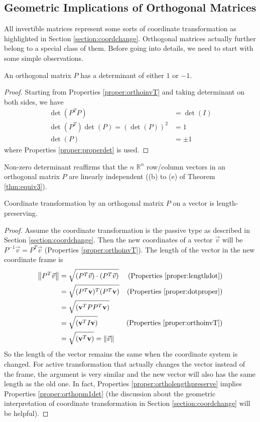 \subsection{Geometric Implications of Orthogonal Matrices}
\label{section:orthogeometricsub}
All invertible matrices represent some sorts of coordinate transformation as highlighted in Section \ref{section:coordchange}. Orthogonal matrices actually further belong to a special class of them. Before going into details, we need to start with some simple observations.
\begin{proper}
\label{proper:orthopm1det}
An orthogonal matrix $P$ has a determinant of either $1$ or $-1$.
\end{proper}
\begin{proof}
Starting from Properties \ref{proper:orthoinvT} and taking determinant on both sides, we have
\begin{align*}
\det(P^TP) &= \det(I) \\
\det(P^T)\det(P) = (\det(P))^2 &= 1\\
\det(P) &= \pm 1
\end{align*}
where Properties \ref{proper:properdet} is used.    
\end{proof} 
Non-zero determinant reaffirms that the $n$ $\mathbb{R}^n$ row/column vectors in an orthogonal matrix $P$ are linearly independent ((b) to (e) of Theorem \ref{thm:equiv3}). 
\begin{proper}
\label{proper:ortholengthpreserve}
Coordinate transformation by an orthogonal matrix $P$ on a vector is length-preserving.
\end{proper}
\begin{proof}
Assume the coordinate transformation is the passive type as described in Section \ref{section:coordchange}. Then the new coordinates of a vector $\vec{v}$ will be $P^{-1}\vec{v} = P^T\vec{v}$ (Properties \ref{proper:orthoinvT}). The length of the vector in the new coordinate frame is
\begin{align*}
\norm{P^T\vec{v}} &= \sqrt{(P^T\vec{v})\cdot(P^T\vec{v})} & \text{(Properties \ref{proper:lengthdot})} \\
&= \sqrt{(P^T\textbf{v})^T(P^T\textbf{v})} & \text{(Properties \ref{proper:dotproper})}\\
&= \sqrt{(\textbf{v}^T PP^T \textbf{v})} \\
&= \sqrt{(\textbf{v}^T I \textbf{v})} & \text{(Properties \ref{proper:orthoinvT})} \\
&= \sqrt{(\textbf{v}^T\textbf{v})} = \norm{\vec{v}}
\end{align*}
So the length of the vector remains the same when the coordinate system is changed. For active transformation that actually changes the vector instead of the frame, the argument is very similar and the new vector will also has the same length as the old one. In fact, Properties \ref{proper:ortholengthpreserve} implies Properties \ref{proper:orthopm1det} (the discussion about the geometric interpretation of coordinate transformation in Section \ref{section:coordchange} will be helpful).
\end{proof}


